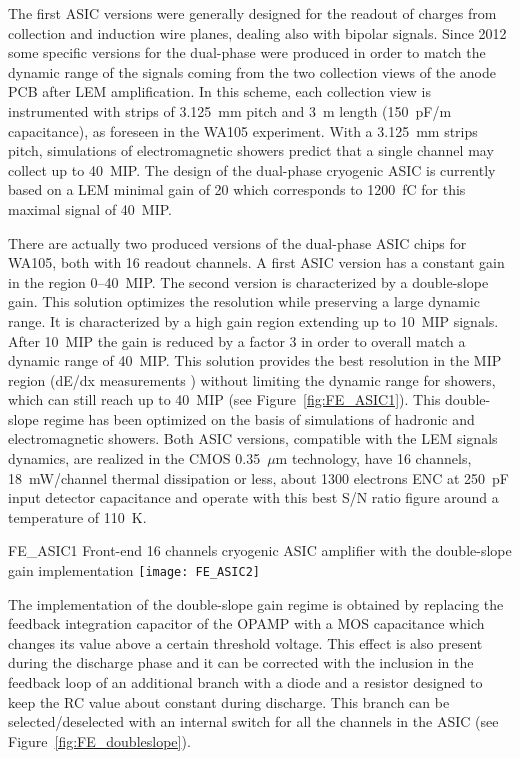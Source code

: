 The first ASIC versions were generally designed for the readout of charges from collection and induction wire planes, dealing also with
bipolar signals. Since 2012 some specific versions for the dual-phase were produced in order to match the dynamic range of the
signals coming from the two collection views of the anode PCB after LEM amplification. In this scheme, each collection view is
instrumented with strips of 3.125~mm pitch and 3~m length (150~pF/m capacitance), as foreseen in the WA105 experiment. With a 3.125~mm
strips pitch, simulations of electromagnetic showers predict that a single channel may collect up to 40~MIP. The design of the
dual-phase cryogenic ASIC is currently based on a LEM minimal gain of 20 which corresponds to 1200~fC for this maximal signal of 40~MIP.

There are actually two produced versions of the dual-phase ASIC chips for WA105, both with 16 readout channels. A first ASIC version
has a constant gain in the region 0--40~MIP. The second version is characterized by a double-slope gain. This solution optimizes the
resolution while preserving a large dynamic range. It is characterized by a high gain region extending up to 10~MIP signals. After 10~MIP the
gain is reduced by a factor 3 in order to overall match a dynamic range of 40~MIP. This solution provides the best resolution in the
MIP region (dE/dx measurements ) without limiting the dynamic range for showers, which can still reach up to 40~MIP (see
Figure~\ref{fig:FE_ASIC1}). This double-slope regime has been optimized on the basis of simulations of hadronic and electromagnetic
showers. Both ASIC versions, compatible with the LEM signals dynamics, are realized in the CMOS 0.35~$\mu$m technology, have 16 channels,
18~mW/channel thermal dissipation or less, about 1300 electrons ENC at 250~pF input detector capacitance and operate with this best S/N ratio
figure around a temperature of 110~K. 

\begin{cdrfigure}{FE_ASIC1} {Front-end 16 channels cryogenic ASIC amplifier with the double-slope gain implementation}
\texttt{[image: FE\_ASIC2]}
\end{cdrfigure}

The implementation of the double-slope gain regime is obtained by replacing the feedback integration capacitor of the OPAMP with a MOS
capacitance which changes its value above a certain threshold voltage. This effect is also present during the discharge phase and it
can be corrected with the inclusion in the feedback loop of an additional branch with a diode and a resistor designed to keep the RC
value about constant during discharge. This branch can be selected/deselected with an internal switch for all the channels in
the ASIC (see Figure~\ref{fig:FE_doubleslope}). 

